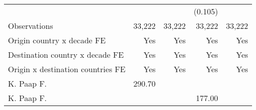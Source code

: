 \begin{tabular}{l*{4}{r}}
                    &                     &                     &     (0.105)         &                     \\
\addlinespace
Observations        &      33,222         &      33,222         &      33,222         &      33,222         \\
Origin country x decade FE&         Yes         &         Yes         &         Yes         &         Yes         \\
Destination country x decade FE&         Yes         &         Yes         &         Yes         &         Yes         \\
Origin x destination countries FE&         Yes         &         Yes         &         Yes         &         Yes         \\
K. Paap F.          &      290.70         &                     &                     &                     \\
K. Paap F.          &                     &                     &      177.00         &                     \\
\bottomrule \end{tabular}
